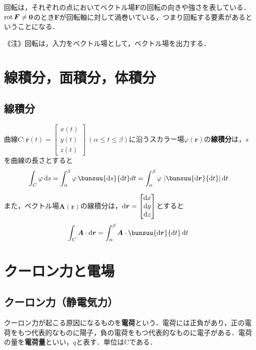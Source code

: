 回転は，それぞれの点においてベクトル場$\bm{F}$の回転の向きや強さを表している．$\operatorname{rot} \bm{F} \ne \bm{0}$のとき$\bm{F}$が回転軸に対して渦巻いている，つまり回転する要素があるということになる．

《注》回転は，入力をベクトル場として，ベクトル場を出力する．



\section{線積分，面積分，体積分}
\subsection{線積分}

曲線$C: \bm{r}(t) =
\begin{bmatrix}
	x(t)\\ y(t)\\ z(t)
\end{bmatrix}\ (\alpha \le t \le \beta)$に沿うスカラー場$\varphi(\bm{r})$の\textbf{線積分}は，$s$を曲線の長さとすると
\begin{equation}
	\int_{C} \varphi\,\md s = \int_{\alpha}^{\beta} \varphi\,\bunsuu{\md s}{\md t}dt = \int_{\alpha}^{\beta} \varphi\,\left|\bunsuu{\md\bm{r}}{\md t}\right|\md t
\end{equation}

また，ベクトル場$\bm{A}(\bm{r})$の線積分は，$\mathrm{d}\bm{r} =
\begin{bmatrix}
	\mathrm{d} x\\ \mathrm{d} y\\ \mathrm{d} z
\end{bmatrix}
$とすると
\begin{equation}
	\int_{C} \bm{A} \cdot \md\bm{r} = \int_{\alpha}^{\beta} \bm{A} \cdot \bunsuu{\md\bm{r}}{\md t}\,\md t
\end{equation}



\section{クーロン力と電場}
\subsection{クーロン力（静電気力）}

クーロン力が起こる原因になるものを\textbf{電荷}という．電荷には正負があり，正の電荷をもつ代表的なものに陽子，負の電荷をもつ代表的なものに電子がある．電荷の量を\textbf{電荷量}といい，$q$と表す．単位は$\mathrm{C}$である．

